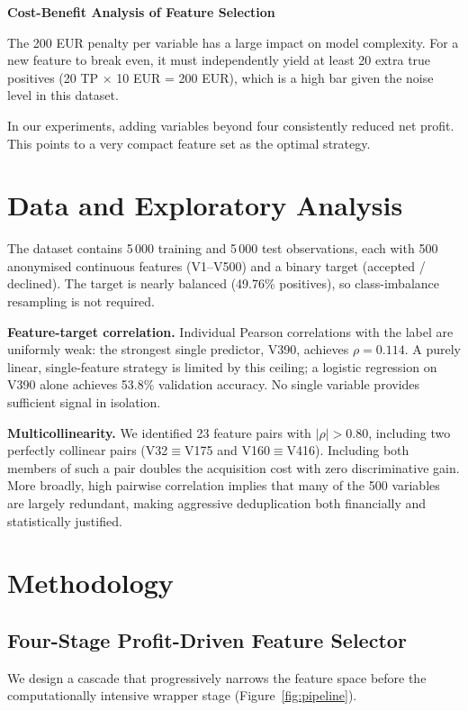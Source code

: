 \documentclass[11pt,a4paper]{article}
\begin{document}
\textbf{Cost-Benefit Analysis of Feature Selection}

The 200 EUR penalty per variable has a large impact on model complexity. For a new feature to break even, it must independently yield at least 20 extra true positives (20 TP $\times$ 10 EUR = 200 EUR), which is a high bar given the noise level in this dataset.

In our experiments, adding variables beyond four consistently reduced net profit. This points to a very compact feature set as the optimal strategy.

\section{Data and Exploratory Analysis}

The dataset contains 5\,000 training and 5\,000 test observations, each with 500 anonymised
continuous features (V1--V500) and a binary target (accepted / declined). The target is nearly
balanced (49.76\% positives), so class-imbalance resampling is not required.

\textbf{Feature-target correlation.}
Individual Pearson correlations with the label are uniformly weak: the strongest single
predictor, V390, achieves $\rho = 0.114$. A purely linear, single-feature strategy is limited
by this ceiling; a logistic regression on V390 alone achieves 53.8\% validation accuracy. No
single variable provides sufficient signal in isolation.

\textbf{Multicollinearity.}
We identified 23 feature pairs with $|\rho| > 0.80$, including two perfectly collinear pairs
(V32$\equiv$V175 and V160$\equiv$V416). Including both members of such a pair doubles the
acquisition cost with zero discriminative gain. More broadly, high pairwise correlation implies
that many of the 500 variables are largely redundant, making aggressive deduplication both
financially and statistically justified.

\section{Methodology}

\subsection{Four-Stage Profit-Driven Feature Selector}

We design a cascade that progressively narrows the feature space before the computationally
intensive wrapper stage (Figure~\ref{fig:pipeline}).
\end{document}
